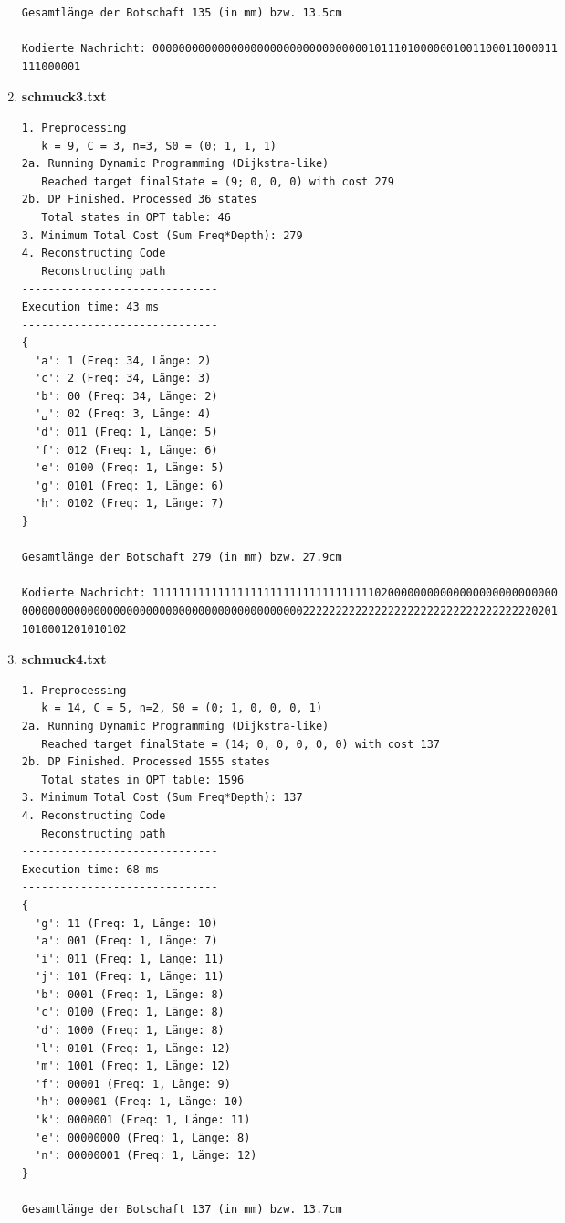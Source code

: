 \documentclass[a4paper,10pt,ngerman]{scrartcl}
\begin{document}
\begin{enumerate}
\begin{verbatim}
Gesamtlänge der Botschaft 135 (in mm) bzw. 13.5cm

Kodierte Nachricht: 00000000000000000000000000000000010111010000001001100011000011
111000001
  \end{verbatim}
  \item \textbf{schmuck3.txt}
  \begin{verbatim}
1. Preprocessing
   k = 9, C = 3, n=3, S0 = (0; 1, 1, 1)
2a. Running Dynamic Programming (Dijkstra-like)
   Reached target finalState = (9; 0, 0, 0) with cost 279
2b. DP Finished. Processed 36 states
   Total states in OPT table: 46
3. Minimum Total Cost (Sum Freq*Depth): 279
4. Reconstructing Code
   Reconstructing path
------------------------------
Execution time: 43 ms
------------------------------
{
  'a': 1 (Freq: 34, Länge: 2)
  'c': 2 (Freq: 34, Länge: 3)
  'b': 00 (Freq: 34, Länge: 2)
  '␣': 02 (Freq: 3, Länge: 4)
  'd': 011 (Freq: 1, Länge: 5)
  'f': 012 (Freq: 1, Länge: 6)
  'e': 0100 (Freq: 1, Länge: 5)
  'g': 0101 (Freq: 1, Länge: 6)
  'h': 0102 (Freq: 1, Länge: 7)
}

Gesamtlänge der Botschaft 279 (in mm) bzw. 27.9cm

Kodierte Nachricht: 11111111111111111111111111111111110200000000000000000000000000
0000000000000000000000000000000000000000000222222222222222222222222222222222220201
1010001201010102
  \end{verbatim}
  \item \textbf{schmuck4.txt}
  \begin{verbatim}
1. Preprocessing
   k = 14, C = 5, n=2, S0 = (0; 1, 0, 0, 0, 1)
2a. Running Dynamic Programming (Dijkstra-like)
   Reached target finalState = (14; 0, 0, 0, 0, 0) with cost 137
2b. DP Finished. Processed 1555 states
   Total states in OPT table: 1596
3. Minimum Total Cost (Sum Freq*Depth): 137
4. Reconstructing Code
   Reconstructing path
------------------------------
Execution time: 68 ms
------------------------------
{
  'g': 11 (Freq: 1, Länge: 10)
  'a': 001 (Freq: 1, Länge: 7)
  'i': 011 (Freq: 1, Länge: 11)
  'j': 101 (Freq: 1, Länge: 11)
  'b': 0001 (Freq: 1, Länge: 8)
  'c': 0100 (Freq: 1, Länge: 8)
  'd': 1000 (Freq: 1, Länge: 8)
  'l': 0101 (Freq: 1, Länge: 12)
  'm': 1001 (Freq: 1, Länge: 12)
  'f': 00001 (Freq: 1, Länge: 9)
  'h': 000001 (Freq: 1, Länge: 10)
  'k': 0000001 (Freq: 1, Länge: 11)
  'e': 00000000 (Freq: 1, Länge: 8)
  'n': 00000001 (Freq: 1, Länge: 12)
}

Gesamtlänge der Botschaft 137 (in mm) bzw. 13.7cm


\end{verbatim}
\end{enumerate}
\end{document}
